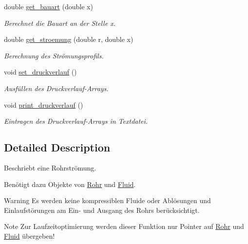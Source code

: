 \begin{DoxyCompactItemize}
\mbox{\label{class_rohrstroemung_a17fccbf71ba0dc1635e3a06fdc740cf3}} 
double \hyperlink{class_rohrstroemung_a17fccbf71ba0dc1635e3a06fdc740cf3}{get\+\_\+bauart} (double x)
\begin{DoxyCompactList}\small\item\em Berechnet die Bauart an der Stelle x. \end{DoxyCompactList}\item 
\mbox{\label{class_rohrstroemung_a1eae88254e88fbb314096c795ec2fac2}} 
double \hyperlink{class_rohrstroemung_a1eae88254e88fbb314096c795ec2fac2}{get\+\_\+stroemung} (double r, double x)
\begin{DoxyCompactList}\small\item\em Berechnung des Strömungsprofils. \end{DoxyCompactList}\item 
\mbox{\label{class_rohrstroemung_ade5cf2d08a2c2c23d951d54ff2d05325}} 
void \hyperlink{class_rohrstroemung_ade5cf2d08a2c2c23d951d54ff2d05325}{set\+\_\+druckverlauf} ()
\begin{DoxyCompactList}\small\item\em Ausfüllen des Druckverlauf-\/\+Arrays. \end{DoxyCompactList}\item 
\mbox{\label{class_rohrstroemung_a3adc6cad22e5ab2132b3d82b7368ba8e}} 
void \hyperlink{class_rohrstroemung_a3adc6cad22e5ab2132b3d82b7368ba8e}{print\+\_\+druckverlauf} ()
\begin{DoxyCompactList}\small\item\em Eintragen des Druckverlauf-\/\+Arrays in Textdatei. \end{DoxyCompactList}\end{DoxyCompactItemize}


\subsection{Detailed Description}
Beschriebt eine Rohrströmung. 

Benötigt dazu Objekte von \hyperlink{class_rohr}{Rohr} und \hyperlink{class_fluid}{Fluid}.

\begin{DoxyWarning}{Warning}
Es werden keine kompressiblen Fluide oder Ablösungen und Einlaufstörungen am Ein-\/ und Ausgang des Rohrs berücksichtigt.
\end{DoxyWarning}
\begin{DoxyNote}{Note}
Zur Laufzeitoptimierung werden dieser Funktion nur Pointer auf \hyperlink{class_rohr}{Rohr} und \hyperlink{class_fluid}{Fluid} übergeben! 
\end{DoxyNote}


